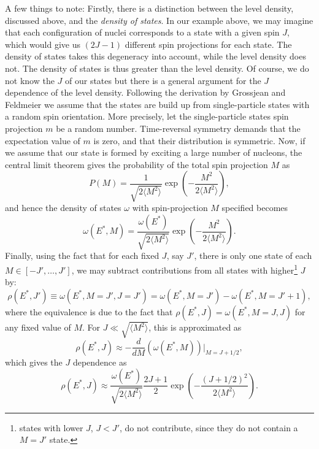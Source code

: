 A few things to note:
Firstly, there is a distinction between the level density, discussed above, and the \emph{density of states}. In our example above, we may imagine that each configuration of nuclei corresponds to a state with a given spin $J$, which would give us $(2J-1)$ different spin projections for each state. The density of states takes this degeneracy into account, while the level density does not. The density of states is thus greater than the level density.
Of course, we do not know the $J$ of our states but there is a general argument for the $J$ dependence of the level density.
Following the derivation by Grossjean and Feldmeier\cite{grossjean1985} we assume that the states are build up from single-particle states with a random spin orientation. More precisely, let the single-particle states spin projection $m$ be a random number. Time-reversal symmetry demands that the expectation value of $m$ is zero, and that their distribution is symmetric. Now, if we assume that our state is formed by exciting a large number of nucleons, the central limit theorem gives the probability of the total spin projection $M$ as
\begin{equation}
P(M) = \frac{1}{\sqrt{2\langle M^2\rangle}} \exp{\left(-\frac{M^2}{2\langle M^2\rangle}\right)},
\end{equation}
and hence the density of states $\omega$ with spin-projection $M$ specified becomes
\begin{equation}
\omega(E^*,M) =  \frac{\omega(E^*)}{\sqrt{2\langle M^2\rangle}} \exp{\left(-\frac{M^2}{2\langle M^2\rangle}\right)}.
\end{equation}
Finally, using the fact that for each fixed $J$, say $J'$, there is only one state of each $M \in [-J',\dots,J']$, we may subtract contributions from all states with higher\footnote{states with lower $J$, $J<J'$, do not contribute, since they do not contain a $M=J'$ state.} $J$ by:
\begin{equation}
\rho(E^*,J') \equiv \omega(E^*,M=J',J=J') = \omega(E^*,M=J')  -\omega(E^*,M=J'+1),
\end{equation}
where the equivalence is due to the fact that $\rho(E^*,J) = \omega(E^*,M=J, J)$ for any fixed value of $M$. For $J\ll \sqrt{\langle M^2 \rangle}$, this is approximated as
\begin{equation}
\rho(E^*,J) \approx - \frac{d}{dM} \left( \omega(E^*,M)\right)|_{M=J+1/2},
\end{equation}
which gives the $J$ dependence as
\begin{equation}
\rho(E^*,J) \approx \frac{\omega(E^*)}{\sqrt{2\langle M^2\rangle}} \frac{2J+1}{2} \exp{\left(-\frac{(J+1/2)^2}{2\langle M^2\rangle}\right)}.\label{eq:rhoj}
\end{equation}

